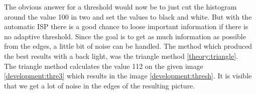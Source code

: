 \begin{center}
	\label{development:thresh}
\end{center}
The obvious answer for a threshold would now be to just cut the histogram around the value 100 in two and set the values to black and white. But with the automatic ISP there is a good chance to loose important information if there is no adaptive threshold. Since the goal is to get as much information as possible from the edges, a little bit of noise can be handled. The method which produced the best results with a back light, was the triangle method \ref{theory:triangle}. \\



The triangle method calculates the value 112 on the given image \ref{development:thre3} which results in the image \ref{development:thresh}. It is visible that we get a lot of noise in the edges of the resulting picture. \\

